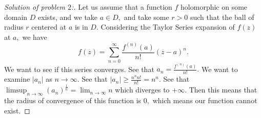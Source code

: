 \documentclass[letterpaper,11pt,twoside]{article}
\theoremstyle{proposition}
\theoremstyle{definition}
\theoremstyle{theorem}
\theoremstyle{definition}
\theoremstyle{definition}
\theoremstyle{definition}
\theoremstyle{lemma}
\theoremstyle{definition}
\theoremstyle{definition}
\theoremstyle{corollary}
\theoremstyle{definition}
\theoremstyle{definition}
\theoremstyle{definition}
\newcommand{\abs}[1]{\left \vert #1 \right \vert}
\begin{document}
	\begin{proof}[Solution of problem $2$:]
		Let us assume that a function $f$ holomorphic on some domain $D$ exists, and we take $a \in D,$ and take some $r>0$ such that the ball of radius $r$
		centered at $a$ is in $D.$ Considering the Taylor Series expansion of $f(z)$ at $a,$ we have $$f(z)= \sum_{n=0}^{\infty} 
		\frac{f^{(n)}(a)}{n!}(z-a)^n.$$ We want to see if this series converges. See that $a_n= \frac{f^{(n)}(a)}{n!}.$ We want to examine $\abs{a_n}$ as $n 
		\to \infty.$ See that $\abs{a_n} \geq \frac{n^nn!}{n!} = n^n.$ See that $\limsup_{n \to \infty} (a_n)^{\frac{1}{n}}= \lim_{n \to \infty} n$ which 
		diverges to $+\infty.$ Then this means that the radius of convergence of this function is $0,$ which means our function cannot exist.
			
 	\end{proof}
\end{document}
